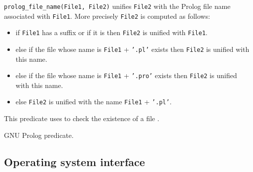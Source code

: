 \Description

\texttt{prolog\_file\_name(File1, File2)} unifies \texttt{File2} with the
Prolog file name associated with \texttt{File1}. More precisely \texttt{File2}
is computed as follows:

\begin{itemize}

\item if \texttt{File1} has a suffix or if it is  then
\texttt{File2} is unified with \texttt{File1}.

\item else if the file whose name is \texttt{File1} + \texttt{'.pl'} exists
then \texttt{File2} is unified with this name.

\item else if the file whose name is \texttt{File1} + \texttt{'.pro'} exists
then \texttt{File2} is unified with this name.

\item else \texttt{File2} is unified with the name \texttt{File1} +
\texttt{'.pl'}.

\end{itemize}

This predicate uses  to check the existence
of a file .

\begin{PlErrors}





\end{PlErrors}

\Portability

GNU Prolog predicate.

\subsection{Operating system interface}

\subsubsection{\label{argument-counter/1}}

